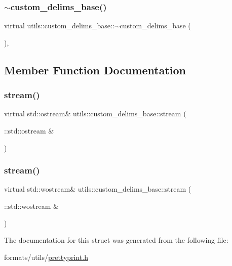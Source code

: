 \subsubsection{\texorpdfstring{$\sim$custom\_delims\_base()}{~custom\_delims\_base()}}
{\footnotesize\ttfamily virtual utils\+::custom\+\_\+delims\+\_\+base\+::$\sim$custom\+\_\+delims\+\_\+base (\begin{DoxyParamCaption}{ }\end{DoxyParamCaption})\hspace{0.3cm}{\ttfamily [inline]}, {\ttfamily [virtual]}}



\subsection{Member Function Documentation}
\mbox{\label{structutils_1_1custom__delims__base_a8889bdbb3f4873107a9d50ab0f6b2382}} 
\subsubsection{\texorpdfstring{stream()}{stream()}\hspace{0.1cm}{\footnotesize\ttfamily [1/2]}}
{\footnotesize\ttfamily virtual std\+::ostream\& utils\+::custom\+\_\+delims\+\_\+base\+::stream (\begin{DoxyParamCaption}\item[{\+::std\+::ostream \&}]{ }\end{DoxyParamCaption})\hspace{0.3cm}{\ttfamily [pure virtual]}}

\mbox{\label{structutils_1_1custom__delims__base_a38f434e7fbacb0fcdca49b0eb8334188}} 
\subsubsection{\texorpdfstring{stream()}{stream()}\hspace{0.1cm}{\footnotesize\ttfamily [2/2]}}
{\footnotesize\ttfamily virtual std\+::wostream\& utils\+::custom\+\_\+delims\+\_\+base\+::stream (\begin{DoxyParamCaption}\item[{\+::std\+::wostream \&}]{ }\end{DoxyParamCaption})\hspace{0.3cm}{\ttfamily [pure virtual]}}



The documentation for this struct was generated from the following file\+:\begin{DoxyCompactItemize}
\item 
formats/utils/\mbox{\hyperlink{prettyprint_8h}{prettyprint.\+h}}\end{DoxyCompactItemize}
